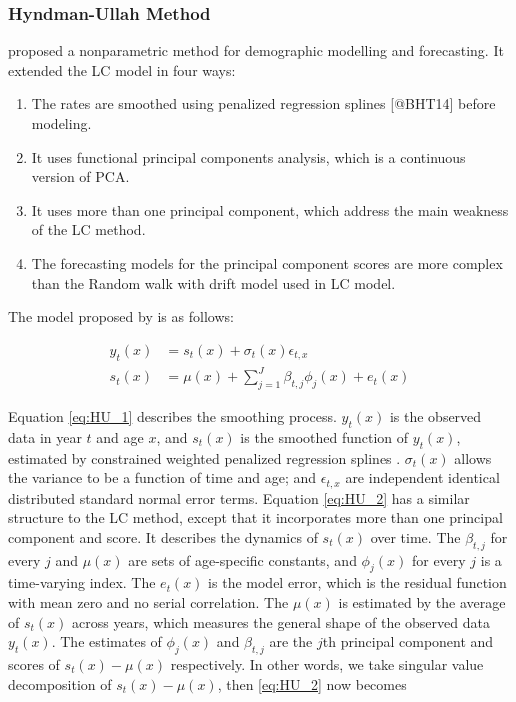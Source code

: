\documentclass[11pt,a4paper,]{article}
\begin{document}
\subsubsection{Hyndman-Ullah Method}\label{hyndman-ullah-method}

\textcite{HU07} proposed a nonparametric method for demographic
modelling and forecasting. It extended the LC model in four ways:

\begin{enumerate}
\item The rates are smoothed using penalized regression splines [@BHT14] before modeling.
\item It uses functional principal components analysis, which is a continuous version of PCA.
\item It uses more than one principal component, which address the main weakness of the LC method.
\item The forecasting models for the principal component scores are more complex than the Random walk with drift model used in LC model.
\end{enumerate}

The model proposed by \textcite{HU07} is as follows:

\begin{align}
  y_t(x) & = s_t(x) + \sigma_t(x)\epsilon_{t,x}\label{eq:HU_1}\\
  s_t(x) & = \mu(x) + \sum_{j=1}^{J}\beta_{t,j}\phi_j(x) + e_t(x)\label{eq:HU_2}
\end{align}

Equation \eqref{eq:HU_1} describes the smoothing process. \(y_t(x)\) is
the observed data in year \(t\) and age \(x\), and \(s_t(x)\) is the
smoothed function of \(y_t(x)\), estimated by constrained weighted
penalized regression splines \autocite{BHT14}. \(\sigma_t(x)\) allows
the variance to be a function of time and age; and \(\epsilon_{t,x}\)
are independent identical distributed standard normal error terms.
Equation \eqref{eq:HU_2} has a similar structure to the LC method,
except that it incorporates more than one principal component and score.
It describes the dynamics of \(s_t(x)\) over time. The \(\beta_{t,j}\)
for every \(j\) and \(\mu(x)\) are sets of age-specific constants, and
\(\phi_j(x)\) for every \(j\) is a time-varying index. The \(e_t(x)\) is
the model error, which is the residual function with mean zero and no
serial correlation. The \(\mu(x)\) is estimated by the average of
\(s_t(x)\) across years, which measures the general shape of the
observed data \(y_t(x)\). The estimates of \(\phi_j(x)\) and
\(\beta_{t,j}\) are the \(j\)th principal component and scores of
\(s_t(x)-\mu(x)\) respectively. In other words, we take singular value
decomposition of \(s_t(x)-\mu(x)\), then \eqref{eq:HU_2} now becomes
\end{document}
